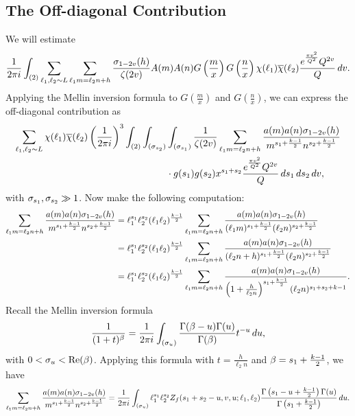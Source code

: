 \documentclass[12pt,reqno,oneside]{amsart}
\begin{document}
  \subsection*{The Off-diagonal Contribution}
    We will estimate
    \[
      \frac{1}{2\pi i}\int_{(2)}\sum_{\ell_{1},\ell_{2} \sim L}\sum_{\ell_{1}m = \ell_{2}n+h}\frac{\sigma_{1-2v}(h)}{\zeta(2v)}A(m)A(n)G\left(\frac{m}{x}\right)G\left(\frac{n}{x}\right)\chi(\ell_{1})\overline{\chi}(\ell_{2})\frac{e^{\frac{\pi v^{2}}{Q^{2}}}Q^{2v}}{Q}\,dv.
    \]
    Applying the Mellin inversion formula to $G\left(\frac{m}{x}\right)$ and $G\left(\frac{n}{x}\right)$, we can express the off-diagonal contribution as
    \begin{align*}
      \sum_{\ell_{1},\ell_{2} \sim L}\chi(\ell_{1})\overline{\chi}(\ell_{2})\left(\frac{1}{2\pi i}\right)^{3}\int_{(2)}\int_{(\sigma_{s_{2}})}&\int_{(\sigma_{s_{1}})}\frac{1}{\zeta(2v)}\sum_{\ell_{1}m = \ell_{2}n+h}\frac{a(m)a(n)\sigma_{1-2v}(h)}{m^{s_{1}+\frac{k-1}{2}}n^{s_{2}+\frac{k-1}{2}}} \\
      &\cdot g(s_{1})g(s_{2})x^{s_{1}+s_{2}}\frac{e^{\frac{\pi v^{2}}{Q^{2}}}Q^{2v}}{Q}\,ds_{1}\,ds_{2}\,dv,
    \end{align*}
    with $\sigma_{s_{1}},\sigma_{s_{2}} \gg 1$. Now make the following computation:
    \begin{align*}
      \sum_{\ell_{1}m = \ell_{2}n+h}\frac{a(m)a(n)\sigma_{1-2v}(h)}{m^{s_{1}+\frac{k-1}{2}}n^{s_{2}+\frac{k-1}{2}}} &= \ell_{1}^{s_{1}}\ell_{2}^{s_{2}}(\ell_{1}\ell_{2})^{\frac{k-1}{2}}\sum_{\ell_{1}m = \ell_{2}n+h}\frac{a(m)a(n)\sigma_{1-2v}(h)}{(\ell_{1}m)^{s_{1}+\frac{k-1}{2}}(\ell_{2}n)^{s_{2}+\frac{k-1}{2}}} \\
      &= \ell_{1}^{s_{1}}\ell_{2}^{s_{2}}(\ell_{1}\ell_{2})^{\frac{k-1}{2}}\sum_{\ell_{1}m = \ell_{2}n+h}\frac{a(m)a(n)\sigma_{1-2v}(h)}{(\ell_{2}n+h)^{s_{1}+\frac{k-1}{2}}(\ell_{2}n)^{s_{2}+\frac{k-1}{2}}} \\
      &= \ell_{1}^{s_{1}}\ell_{2}^{s_{2}}(\ell_{1}\ell_{2})^{\frac{k-1}{2}}\sum_{\ell_{1}m = \ell_{2}n+h}\frac{a(m)a(n)\sigma_{1-2v}(h)}{\left(1+\frac{h}{\ell_{2}n}\right)^{s_{1}+\frac{k-1}{2}}(\ell_{2}n)^{s_{1}+s_{2}+k-1}}.
    \end{align*}
    Recall the Mellin inversion formula
    \[
      \frac{1}{(1+t)^{\beta}} = \frac{1}{2\pi i}\int_{(\sigma_{u})}\frac{\Gamma(\beta-u)\Gamma(u)}{\Gamma(\beta)}t^{-u}\,du,
    \]
    with $0 < \sigma_{u} < \mathrm{Re}(\beta)$. Applying this formula with $t = \frac{h}{\ell_{2}n}$ and $\beta = s_{1}+\frac{k-1}{2}$, we have
    \[
      \sum_{\ell_{1}m = \ell_{2}n+h}\frac{a(m)a(n)\sigma_{1-2v}(h)}{m^{s_{1}+\frac{k-1}{2}}n^{s_{2}+\frac{k-1}{2}}} = \frac{1}{2\pi i}\int_{(\sigma_{u})}\ell_{1}^{s_{1}}\ell_{2}^{s_{2}}Z_{f}(s_{1}+s_{2}-u,v,u;\ell_{1},\ell_{2})\frac{\Gamma\left(s_{1}-u+\frac{k-1}{2}\right)\Gamma(u)}{\Gamma\left(s_{1}+\frac{k-1}{2}\right)}\,du.
    \]
\end{document}
